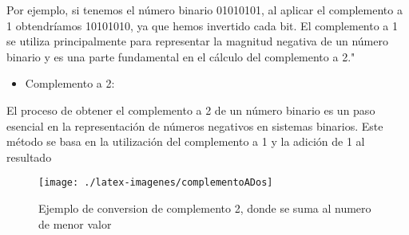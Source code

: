 Por ejemplo, si tenemos el número binario 01010101, al aplicar el complemento a 1 obtendríamos 10101010, ya que hemos invertido cada bit. El complemento a 1 se utiliza principalmente para representar la magnitud negativa de un número binario y es una parte fundamental en el cálculo del complemento a 2."
\newline

\begin{itemize}
    \item Complemento a 2:
\end{itemize}
El proceso de obtener el complemento a 2 de un número binario es un paso esencial en la representación de números negativos en sistemas binarios. Este método se basa en la utilización del complemento a 1 y la adición de 1 al resultado
\newline

\begin{figure}
\centerline{\texttt{[image: ./latex-imagenes/complementoADos]}}
\caption{Ejemplo de conversion de complemento 2, donde se suma al numero de menor valor }
\vspace*{-5pt}
\label{fig:dos}
\end{figure}

